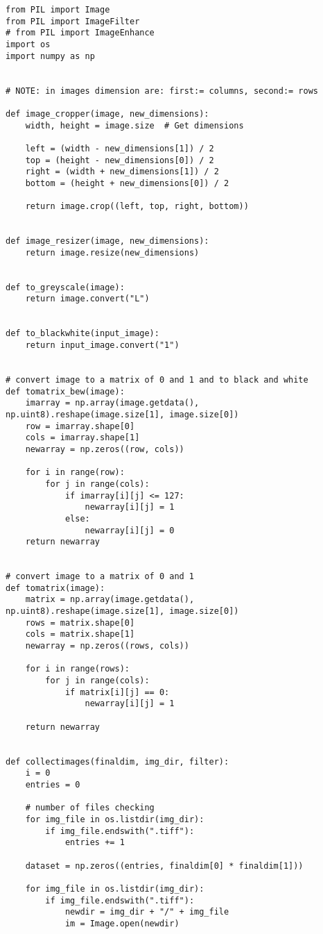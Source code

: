\documentclass[letterpaper,twocolumn,10pt]{article}
\begin{document}
\begin{lstlisting}
from PIL import Image
from PIL import ImageFilter
# from PIL import ImageEnhance
import os
import numpy as np


# NOTE: in images dimension are: first:= columns, second:= rows

def image_cropper(image, new_dimensions):
    width, height = image.size  # Get dimensions

    left = (width - new_dimensions[1]) / 2
    top = (height - new_dimensions[0]) / 2
    right = (width + new_dimensions[1]) / 2
    bottom = (height + new_dimensions[0]) / 2

    return image.crop((left, top, right, bottom))


def image_resizer(image, new_dimensions):
    return image.resize(new_dimensions)


def to_greyscale(image):
    return image.convert("L")


def to_blackwhite(input_image):
    return input_image.convert("1")


# convert image to a matrix of 0 and 1 and to black and white
def tomatrix_bew(image):
    imarray = np.array(image.getdata(), np.uint8).reshape(image.size[1], image.size[0])
    row = imarray.shape[0]
    cols = imarray.shape[1]
    newarray = np.zeros((row, cols))

    for i in range(row):
        for j in range(cols):
            if imarray[i][j] <= 127:
                newarray[i][j] = 1
            else:
                newarray[i][j] = 0
    return newarray


# convert image to a matrix of 0 and 1
def tomatrix(image):
    matrix = np.array(image.getdata(), np.uint8).reshape(image.size[1], image.size[0])
    rows = matrix.shape[0]
    cols = matrix.shape[1]
    newarray = np.zeros((rows, cols))

    for i in range(rows):
        for j in range(cols):
            if matrix[i][j] == 0:
                newarray[i][j] = 1

    return newarray


def collectimages(finaldim, img_dir, filter):
    i = 0
    entries = 0

    # number of files checking
    for img_file in os.listdir(img_dir):
        if img_file.endswith(".tiff"):
            entries += 1

    dataset = np.zeros((entries, finaldim[0] * finaldim[1]))

    for img_file in os.listdir(img_dir):
        if img_file.endswith(".tiff"):
            newdir = img_dir + "/" + img_file
            im = Image.open(newdir)


\end{lstlisting}
\end{document}
